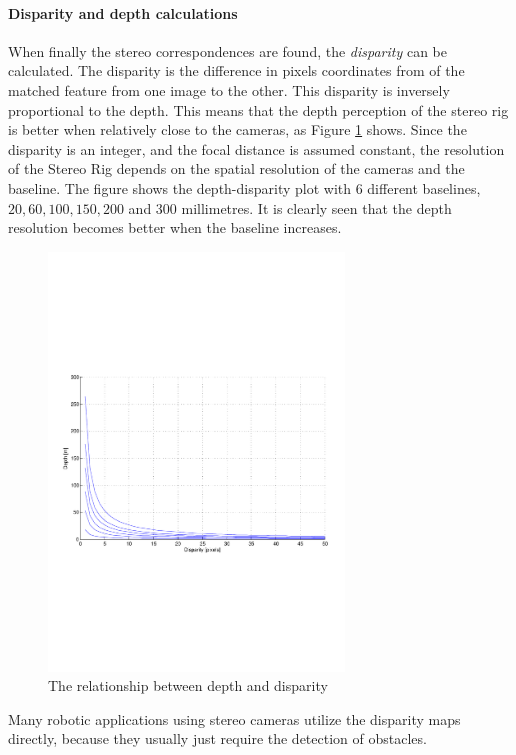 \paragraph{Disparity and depth calculations}
When finally the stereo correspondences are found, the \emph{disparity} can be calculated.
The disparity is the difference in pixels coordinates from of the matched feature from one
image to the other. This disparity is inversely proportional to the depth. This means that
the depth perception of the stereo rig is better when relatively close to the cameras, as
Figure \ref{chap2:fig-disparity-depth} shows. 
Since the disparity is an integer, and the focal distance is assumed constant, 
the resolution of the Stereo Rig depends on the spatial resolution of the cameras and the 
baseline. The figure shows the depth-disparity plot with 6 different baselines, $20,
60, 100, 150, 200$ and $300$ millimetres. It is clearly seen that the depth resolution becomes better
when the baseline increases. 
\begin{figure}[htbp]
    \centering
    \includegraphics[width=0.7\textwidth]{pics/disparity}
    \caption{The relationship between depth and disparity}
    \label{chap2:fig-disparity-depth}
\end{figure}

Many robotic applications using stereo cameras utilize the disparity maps directly,
because they usually just require the detection of obstacles. 

